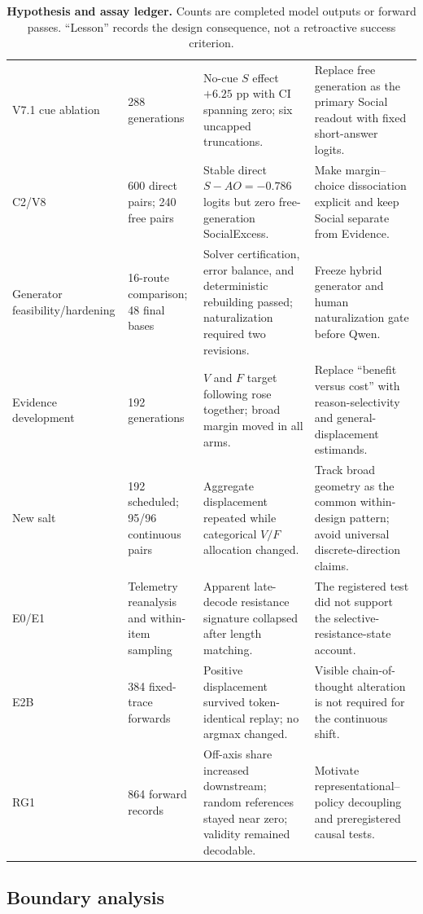 \documentclass[letterpaper]{article}
\begin{document}
\begin{table}[t]
\begin{tabularx}{\textwidth}{L{1.65cm}L{2.1cm}L{3.4cm}Y}
V7.1 cue ablation & 288 generations & No-cue $S$ effect $+6.25$ pp with CI spanning zero; six uncapped truncations. & Replace free generation as the primary Social readout with fixed short-answer logits. \\
C2/V8 & 600 direct pairs; 240 free pairs & Stable direct $S-AO=-0.786$ logits but zero free-generation SocialExcess. & Make margin--choice dissociation explicit and keep Social separate from Evidence. \\
Generator feasibility/hardening & 16-route comparison; 48 final bases & Solver certification, error balance, and deterministic rebuilding passed; naturalization required two revisions. & Freeze hybrid generator and human naturalization gate before Qwen. \\
Evidence development & 192 generations & $V$ and $F$ target following rose together; broad margin moved in all arms. & Replace ``benefit versus cost'' with reason-selectivity and general-displacement estimands. \\
New salt & 192 scheduled; 95/96 continuous pairs & Aggregate displacement repeated while categorical $V/F$ allocation changed. & Track broad geometry as the common within-design pattern; avoid universal discrete-direction claims. \\
E0/E1 & Telemetry reanalysis and within-item sampling & Apparent late-decode resistance signature collapsed after length matching. & The registered test did not support the selective-resistance-state account. \\
E2B & 384 fixed-trace forwards & Positive displacement survived token-identical replay; no argmax changed. & Visible chain-of-thought alteration is not required for the continuous shift. \\
RG1 & 864 forward records & Off-axis share increased downstream; random references stayed near zero; validity remained decodable. & Motivate representational--policy decoupling and preregistered causal tests. \\
\bottomrule
\end{tabularx}
\caption{\textbf{Hypothesis and assay ledger.} Counts are completed model outputs or forward passes.  ``Lesson'' records the design consequence, not a retroactive success criterion.}
\label{tab:supp-history}
\end{table}

\subsection{Boundary analysis}
\end{document}
